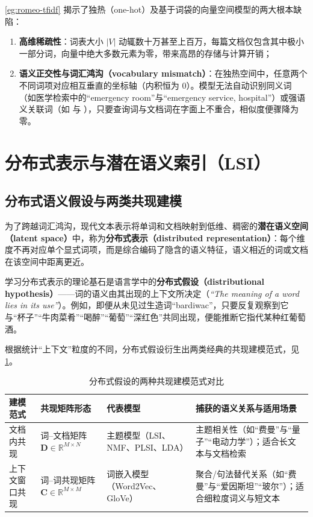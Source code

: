 \cref{eg:romeo-tfidf} 揭示了独热（one-hot）及基于词袋的向量空间模型的两大根本缺陷：
\begin{enumerate}
  \item \textbf{高维稀疏性}：词表大小 $|V|$ 动辄数十万甚至上百万，每篇文档仅包含其中极小一部分词，向量中绝大多数元素为零，带来高昂的存储与计算开销；
  \item \textbf{语义正交性与词汇鸿沟（vocabulary mismatch）}：在独热空间中，任意两个不同词项对应相互垂直的坐标轴（内积恒为 $0$）。模型无法自动识别同义词（如医学检索中的“emergency room”与“emergency service, hospital”）或强语义关联词（如  与 ），只要查询词与文档词在字面上不重合，相似度便骤降为零。
\end{enumerate}

\section{分布式表示与潜在语义索引（LSI）}\label{sec:distributed-lsi}

\subsection{分布式语义假设与两类共现建模}

为了跨越词汇鸿沟，现代文本表示将单词和文档映射到低维、稠密的\textbf{潜在语义空间（latent space）}中，称为\textbf{分布式表示（distributed representation）}：每个维度不再对应单个显式词项，而是综合编码了隐含的语义特征，语义相近的词或文档在该空间中距离更近。

学习分布式表示的理论基石是语言学中的\textbf{分布式假设（distributional hypothesis）}——词的语义由其出现的上下文所决定（\emph{``The meaning of a word lies in its use''}）。例如，即便从未见过生造词“bardiwac”，只要反复观察到它与“杯子”“牛肉菜肴”“喝醉”“葡萄”“深红色”共同出现，便能推断它指代某种红葡萄酒。

根据统计“上下文”粒度的不同，分布式假设衍生出两类经典的共现建模范式，见\cref{tab:cooccurrence-paradigms}。

\begin{table}[htbp]
  \centering
  \small
  \caption{分布式假设的两种共现建模范式对比}\label{tab:cooccurrence-paradigms}
  \begin{tabular}{>{\raggedright\arraybackslash}p{2.4cm}>{\raggedright\arraybackslash}p{3.4cm}>{\raggedright\arraybackslash}p{3.6cm}>{\raggedright\arraybackslash}p{3.8cm}}
    \toprule
    建模范式 & 共现矩阵形态 & 代表模型 & 捕获的语义关系与适用场景 \\
    \midrule
    文档内共现 & 词--文档矩阵 $\mathbf{D}\in\mathbb{R}^{M\times N}$ & 主题模型（LSI、NMF、PLSI、LDA） & 主题相关性（如“费曼”与“量子”“电动力学”）；适合长文本与文档检索 \\
    上下文窗口共现 & 词--词共现矩阵 $\mathbf{C}\in\mathbb{R}^{M\times M}$ & 词嵌入模型（Word2Vec、GloVe） & 聚合/句法替代关系（如“费曼”与“爱因斯坦”“玻尔”）；适合细粒度词义与短文本 \\
    \bottomrule
  \end{tabular}
\end{table}

